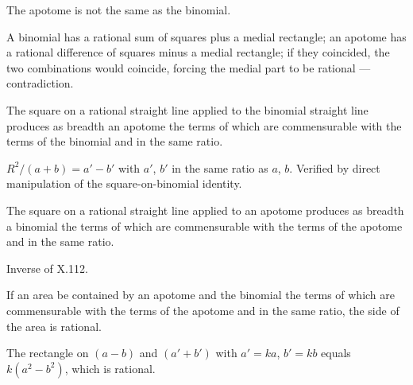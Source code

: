 \documentclass{rrxiv}
\begin{document}
\begin{claim}
\label{prop:X.111}
The apotome is not the same as the binomial.
\end{claim}
\begin{evidence}[Proof of X.111]
\label{ev:X.111}
A binomial has a rational sum of squares plus a medial rectangle; an
apotome has a rational difference of squares minus a medial
rectangle; if they coincided, the two combinations would coincide,
forcing the medial part to be rational --- contradiction.
\end{evidence}

\begin{claim}
\label{prop:X.112}
The square on a rational straight line applied to the binomial
straight line produces as breadth an apotome the terms of which are
commensurable with the terms of the binomial and in the same ratio.
\end{claim}
\begin{evidence}[Proof of X.112]
\label{ev:X.112}
$R^2 / (a + b) = a' - b'$ with $a'$, $b'$ in the same ratio as $a$,
$b$.  Verified by direct manipulation of the square-on-binomial
identity.
\end{evidence}

\begin{claim}
\label{prop:X.113}
The square on a rational straight line applied to an apotome produces
as breadth a binomial the terms of which are commensurable with the
terms of the apotome and in the same ratio.
\end{claim}
\begin{evidence}[Proof of X.113]
\label{ev:X.113}
Inverse of X.112.
\end{evidence}

\begin{claim}
\label{prop:X.114}
If an area be contained by an apotome and the binomial the terms of
which are commensurable with the terms of the apotome and in the
same ratio, the side of the area is rational.
\end{claim}
\begin{evidence}[Proof of X.114]
\label{ev:X.114}
The rectangle on $(a - b)$ and $(a' + b')$ with $a' = ka$, $b' = kb$
equals $k(a^2 - b^2)$, which is rational.
\end{evidence}
\end{document}
